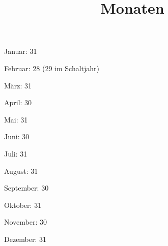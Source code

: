 \documentclass[a4paper]{article}
\title{Monaten}
\date{}
\begin{document}
    \maketitle
    
    Januar: 31

    Februar: 28 (29 im Schaltjahr)
    
    März: 31
    
    April: 30
    
    Mai: 31
    
    Juni: 30
    
    Juli: 31
    
    August: 31
    
    September: 30
    
    Oktober: 31
    
    November: 30
    
    Dezember: 31
    
\end{document}

